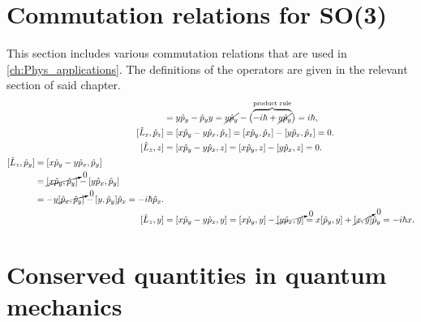 \section{Commutation relations for SO(3)}\label{sec:SO3_comms}
This section includes various commutation relations that are used in \cref{ch:Phys_applications}. The definitions of the operators are given in the relevant section of said chapter.
\begin{align}
    [y,\hat{p}_y] &= y\hat{p}_y - \hat{p}_y y = \cancel{y\hat{p}_y} - \bigl(\overbrace{-i\hbar + \cancel{y\hat{p}_y}}^{\textrm{product rule}}\bigr) = i\hbar, \\
    [\hat{L}_z,\hat{p}_z]
        &= [x\hat{p}_y - y\hat{p}_x, \hat{p}_z] = [x\hat{p}_y, \hat{p}_z] - [y\hat{p}_x, \hat{p}_z] = 0. \\
    [\hat{L}_z, z] &= [x\hat{p}_y - y\hat{p}_x, z] = [x\hat{p}_y, z] - [y\hat{p}_x, z] = 0. \\
    \begin{split}        
    [\hat{L}_z,\hat{p}_y] 
        &= [x\hat{p}_y - y\hat{p}_x, \hat{p}_y] \\
        &= \cancelto{0}{[x\hat{p}_y, \hat{p}_y]} - [y\hat{p}_x, \hat{p}_y] \\
        &= -y\cancelto{0}{[\hat{p}_x, \hat{p}_y]} - [y, \hat{p}_y]\hat{p}_x = -i\hbar\hat{p}_x.
    \end{split}\\
    [\hat{L}_z, y] &= [x\hat{p}_y - y\hat{p}_x, y] = [x\hat{p}_y, y] - \cancelto{0}{[y\hat{p}_x, y]} = x[\hat{p}_y, y] + \cancelto{0}{[x, y]}\hat{p}_y = -i\hbar x.
\end{align}

\section{Conserved quantities in quantum mechanics}\label{sec:conserved_quantities}


    
